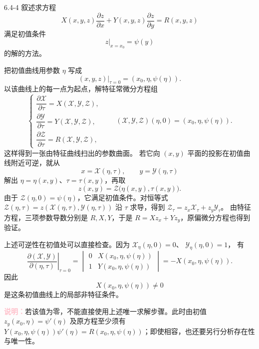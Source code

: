\documentclass[UTF8,a4paper,11pt]{ctexart}
\newcommand{\note}[1]{\par\smallskip\noindent\textcolor{pink}{\bfseries 说明：}#1\par\smallskip}
\begin{document}
\begin{problem}{6.4-4}
叙述求方程
\[
X(x,y,z)\frac{\partial z}{\partial x}
+Y(x,y,z)\frac{\partial z}{\partial y}
=R(x,y,z)
\]
满足初值条件
\[
\left.z\right|_{x=x_0}=\psi(y)
\]
的解的方法。
\end{problem}
\begin{solution}
把初值曲线用参数 $\eta$ 写成
\[
(x,y,z)\big|_{\tau=0}
=(x_0,\eta,\psi(\eta)).
\]
以该曲线上的每一点为起点，解特征常微分方程组
\[
\begin{cases}
\dfrac{\partial\mathcal X}{\partial\tau}
=X(\mathcal X,\mathcal Y,\mathcal Z),\\[4pt]
\dfrac{\partial\mathcal Y}{\partial\tau}
=Y(\mathcal X,\mathcal Y,\mathcal Z),\\[4pt]
\dfrac{\partial\mathcal Z}{\partial\tau}
=R(\mathcal X,\mathcal Y,\mathcal Z),
\end{cases}
\qquad
(\mathcal X,\mathcal Y,\mathcal Z)(\eta,0)
=(x_0,\eta,\psi(\eta)).
\]
这样得到一张由特征曲线扫出的参数曲面。
若它向 $(x,y)$ 平面的投影在初值曲线附近可逆，就从
\[
x=\mathcal X(\eta,\tau),\qquad
y=\mathcal Y(\eta,\tau)
\]
解出 $\eta=\eta(x,y)$、$\tau=\tau(x,y)$，再取
\[
\boxed{z(x,y)=
\mathcal Z\bigl(\eta(x,y),\tau(x,y)\bigr).}
\]
由于 $\mathcal Z(\eta,0)=\psi(\eta)$，它满足初值条件。对恒等式
$\mathcal Z(\eta,\tau)
=z(\mathcal X(\eta,\tau),\mathcal Y(\eta,\tau))$
沿 $\tau$ 求导，得到
$\mathcal Z_\tau=z_x\mathcal X_\tau+z_y\mathcal Y_\tau$。
由特征方程，三项参数导数分别是 $R,X,Y$，于是
$R=Xz_x+Yz_y$，原偏微分方程也得到验证。

上述可逆性在初值处可以直接检查。因为
$\mathcal X_\eta(\eta,0)=0$、
$\mathcal Y_\eta(\eta,0)=1$，
有
\[
\left.\frac{\partial(\mathcal X,\mathcal Y)}
{\partial(\eta,\tau)}\right|_{\tau=0}
=
\begin{vmatrix}
0&X(x_0,\eta,\psi(\eta))\\
1&Y(x_0,\eta,\psi(\eta))
\end{vmatrix}
=-X(x_0,\eta,\psi(\eta)).
\]
因此
\[
\boxed{X(x_0,\eta,\psi(\eta))\ne0}
\]
是这条初值曲线上的局部非特征条件。
\note{若该值为零，不能直接使用上述唯一求解步骤。此时由初值 $z_y(x_0,\eta)=\psi'(\eta)$ 及原方程至少须有 $Y(x_0,\eta,\psi(\eta))\psi'(\eta)=R(x_0,\eta,\psi(\eta))$；即使相容，也还要另行分析存在性与唯一性。}
\end{solution}
\end{document}
